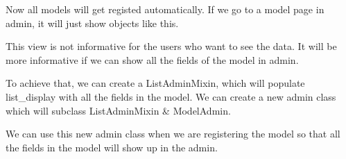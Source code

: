\documentclass[letterpaper,11pt,english]{sphinxmanual}
\begin{document}
\begin{sphinxVerbatim}[commandchars=\\\{\}]
    
   


 

     
          
           
             
\end{sphinxVerbatim}

Now all models will get registed automatically. If we go to a model page in admin, it will just show objects like this.


This view is not informative for the users who want to see the data. It will be more informative if we can show all the fields of the model in admin.

To achieve that, we can create a ListAdminMixin, which will populate list\_display with all the fields in the model. We can create a new admin class which will subclass ListAdminMixin \& ModelAdmin.

We can use this new admin class when we are registering the model so that all the fields in the model will show up in the admin.
\end{document}
